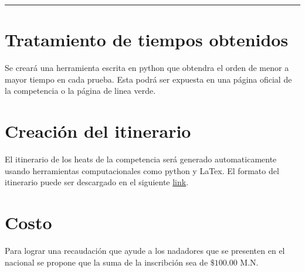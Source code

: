 \vspace{0.5cm}
\hrule

\section{Tratamiento de tiempos obtenidos}
Se creará una herramienta escrita en python que obtendra el orden de menor a mayor tiempo en cada prueba. Esta podrá ser expuesta en una página oficial de la competencia o la página de linea verde.


\section{Creación del itinerario}
El itinerario de los heats de la competencia será generado automaticamente usando herramientas computacionales como python y LaTex. El formato del itinerario puede ser descargado en el siguiente \href{https://github.com/giovannilopez9808/Competencia_2021/raw/main/schedule/Main.pdf}{link}.

\section{Costo}
Para lograr una recaudación que ayude a los nadadores que se presenten en el nacional se propone que la suma de la inscribción sea de $\$100.00$ M.N.